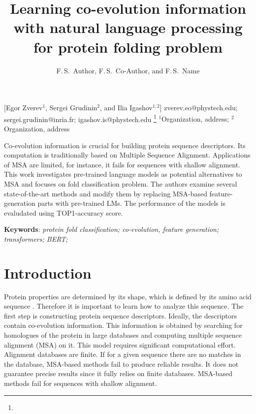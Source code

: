 \documentclass[12pt, twoside]{article}
\begin{document}
\English
\title
	[] %
    { Learning co-evolution information with natural language processing for protein folding problem} %
\author
	[F.\,S.~Author] %
	{F.\,S.~Author, F.\,S.~Co-Author, and F.\,S.~Name} %
    [Egor Zverev$^1$, Sergei Grudinin$^2$, and Ilia Igashov$^{1, 2}$] %
\email
    {zverev.eo@phystech.edu; sergei.grudinin@inria.fr; igashov.is@phystech.edu}
\thanks
    {}
\organization
    {$^1$Organization, address;
     $^2$Organization, address}
\abstract
    {Co-evolution information is crucial for building protein sequence descriptors. Its computation is traditionally based on Multiple Sequence Alignment. Applications of MSA are limited, for instance, it fails for sequences with shallow alignment. This work investigates pre-trained language models as potential alternatives to MSA and focuses on fold classification problem. The authors examine several  state-of-the-art  methods  and  modify  them  by  replacing  MSA-based  feature-generation parts with pre-trained LMs. The performance of the models is evaludated using TOP1-accuracy score.

		
	\noindent
    	\textbf{Keywords}: \emph{protein fold classification; co-evolution, feature generation; transformers; BERT;  }}





\maketitle
\linenumbers

\section{Introduction}
\noindent %




Protein properties are determined by its shape, which is defined by its amino acid sequence \cite{cellbiology}. Therefore it is important to learn how to analyze this sequence.
The first step is constructing protein sequence descriptors. Ideally, the descriptors contain co-evolution information\cite{DeepSF, msa_transform}. This information is obtained by searching for homologues of the protein in large databases and computing multiple sequence alignment (MSA) on it. This model requires significant computational effort. Alignment databases are finite. If for a given sequence there are no matches in the database, MSA-based methods fail to produce reliable results. 
 It does not guarantee precise results since it fully relies on finite databases. MSA-based methods fail for sequences with shallow alignment.
\end{document}
